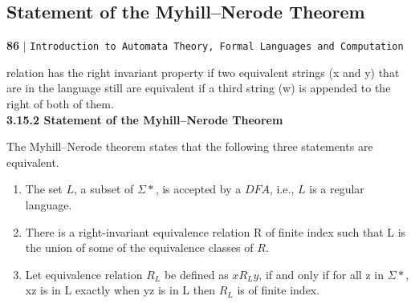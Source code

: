 \documentclass[8pt]{beamer}
\begin{document}
\begin{frame}
\section*{Statement of the Myhill–Nerode Theorem}
\begin{flushleft}
    \textbf{86}\hspace*{0.1cm} \textbf{$|$} \hspace*{0.1cm} \texttt{Introduction to Automata Theory, Formal Languages and Computation}
  \end{flushleft}

\vspace*{0.5cm}
relation has the right invariant property if two equivalent strings (x and y) that are in the language still
are equivalent if a third string (w) is appended to the right of both of them.\\

\vspace*{0.2cm}
\large{
\textbf{3.15.2 Statement of the Myhill–Nerode Theorem}
}

\vspace*{0.1cm}
The Myhill–Nerode theorem states that the following three statements are equivalent.\\

\small{
\begin{enumerate}
  \item The set $L$, a subset of $\Sigma*$, is accepted by a $DFA$, i.e., $L$ is a regular language.\\
  \item There is a right-invariant equivalence relation R of finite index such that L is the union of some of
the equivalence classes of $R$.\\
  \item Let equivalence relation $R_L$ be defined as $xR_Ly$, if and only if for all z in $\Sigma*$, xz is in L exactly when
yz is in L then $R_L$ is of finite index.\\
\end{enumerate}
}
\vspace*{0.2cm}
\end{frame}
\end{document}
